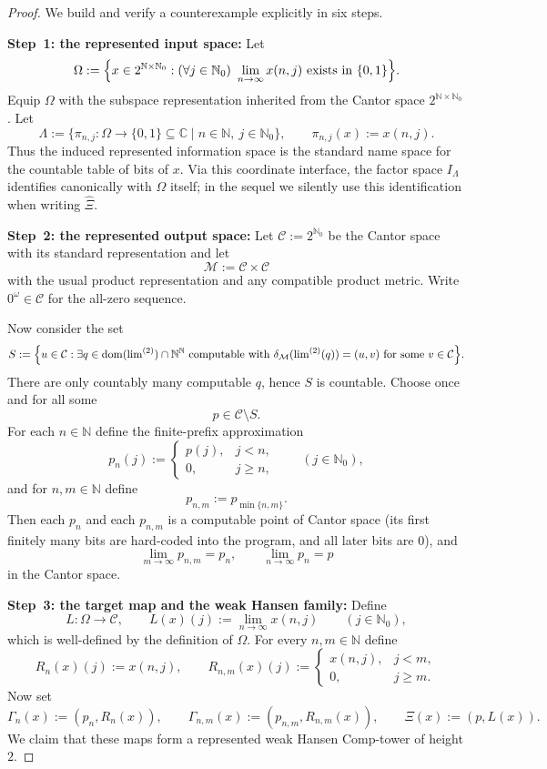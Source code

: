 \documentclass{lmcs} %
\theoremstyle{plain}
\theoremstyle{plain}
\theoremstyle{definition}
\theoremstyle{remark}
\theoremstyle{definition}
\theoremstyle{remark}
\numberwithin{equation}{section}
\newcommand{\Lim}{\operatorname{lim}}
\newcommand{\Limi}[1]{\Lim^{(#1)}}
\begin{document}
\begin{proof}
	We build and verify a counterexample explicitly in six steps.
	
	\smallskip
	\noindent
	\textbf{Step~1: the represented input space:}
	Let
	\[
	\Omega:=\Bigl\{x\in 2^{\mathbb N\times\mathbb N_0} : (\forall j\in\mathbb N_0)\ \lim_{n\to\infty}x(n,j)
	\text{ exists in }\{0,1\}\Bigr\}.
	\]
	Equip $\Omega$ with the subspace representation inherited from the Cantor space
	$2^{\mathbb N\times\mathbb N_0}$.
	Let
	\[
	\Lambda:=\{\pi_{n,j}:\Omega\to\{0,1\}\subseteq\mathbb C \mid n\in\mathbb{N},\ j\in\mathbb{N}_0 \},
	\qquad \pi_{n,j}(x):=x(n,j).
	\]
	Thus the induced represented information space is the standard name space for the
	countable table of bits of $x$. Via this coordinate interface, the factor space $I_\Lambda$ identifies canonically with $\Omega$ itself; in the sequel we silently use this identification when writing $\widehat\Xi$.
	
	\smallskip
	\noindent
	\textbf{Step~2: the represented output space:}
	Let $\mathcal C:=2^{\mathbb N_0}$ be the Cantor space with its standard representation and let
	\[
	\mathcal M:=\mathcal C\times \mathcal C
	\]
	with the usual product representation and any compatible product metric.
	Write $0^{\omega}\in\mathcal C$ for the all-zero sequence.
	
	Now consider the set
	\[
	S:=\Bigl\{u\in\mathcal C : \exists q\in\operatorname{dom}(\Limi{2})\cap\mathbb N^{\mathbb N}
	\text{ computable with }\delta_{\mathcal M}(\Limi{2}(q))=(u,v)
	\text{ for some }v\in\mathcal C\Bigr\}.
	\]
	There are only countably many computable $q$, hence $S$ is countable.
	Choose once and for all some
	\[
	p\in \mathcal C\setminus S.
	\]
	For each $n\in\mathbb N$ define the finite-prefix approximation
	\[
	p_n(j):=
	\begin{cases}
		p(j), & j<n,\\
		0, & j\ge n,
	\end{cases}
	\qquad (j\in\mathbb N_0),
	\]
	and for $n,m\in\mathbb N$ define
	\[
	p_{n,m}:=p_{\min\{n,m\}}.
	\]
	Then each $p_n$ and each $p_{n,m}$ is a computable point of Cantor space (its first
	finitely many bits are hard-coded into the program, and all later bits are $0$), and
	\[
	\lim_{m\to\infty}p_{n,m}=p_n,
	\qquad
	\lim_{n\to\infty}p_n=p
	\]
	in the Cantor space.
	
	\smallskip
	\noindent
	\textbf{Step~3: the target map and the weak Hansen family:}
	Define
	\[
	L\colon \Omega\to \mathcal C,
	\qquad
	L(x)(j):=\lim_{n\to\infty}x(n,j) \qquad (j\in\mathbb{N}_0),
	\]
	which is well-defined by the definition of $\Omega$. For every $n,m\in\mathbb N$ define
	\[
	R_n(x)(j):=x(n,j),
	\qquad
	R_{n,m}(x)(j):=
	\begin{cases}
		x(n,j), & j<m,\\
		0, & j\ge m.
	\end{cases}
	\]
	Now set
	\[
	\Gamma_n(x):=(p_n,R_n(x)),
	\qquad
	\Gamma_{n,m}(x):=(p_{n,m},R_{n,m}(x)),
	\qquad
	\Xi(x):=(p,L(x)).
	\]
	We claim that these maps form a represented weak Hansen $\mathrm{Comp}$-tower of
	height $2$.
	

\end{proof}
\end{document}
